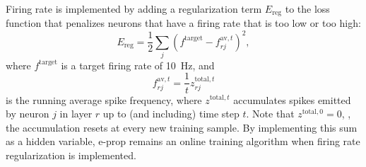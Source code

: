 		Firing rate is implemented by adding a regularization term $E_\text{reg}$ to the loss function that penalizes neurons that have a firing rate that is too low or too high:
		\begin{equation}
			E_\text{reg} = \frac{1}{2}\sum_j\left(f^\text{target} - f^{\text{av}, t}_{rj}\right)^2,
		\end{equation}
		where $f^\text{target}$ is a target firing rate of \SI{10}{\Hz}, and
		\begin{equation}
		f^{\text{av},t}_{rj} = \frac{1}{t} z^{\text{total},t}_{rj}
		\end{equation}
		is the running average spike frequency, where $z^{\text{total},t}$ accumulates spikes emitted by neuron $j$ in layer $r$ up to (and including) time step $t$.
		Note that $z^{\text{total},0} = 0$, \ie, the accumulation resets at every new training sample.
		By implementing this sum as a hidden variable, e-prop remains an online training algorithm when firing rate regularization is implemented.

